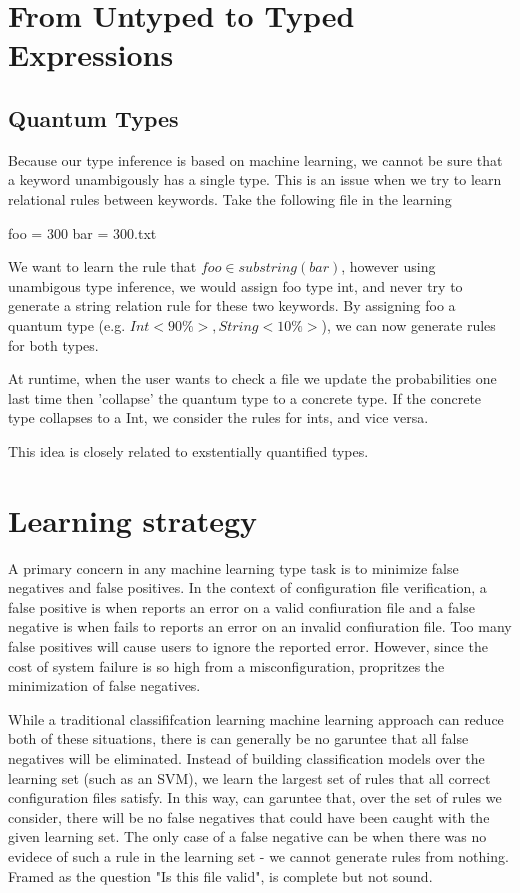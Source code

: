 \section{From Untyped to Typed Expressions}
\label{sec:translation}


\subsection{Quantum Types}

Because our type inference is based on machine learning, we cannot be sure that a keyword unambigously has a single type.
This is an issue when we try to learn relational rules between keywords. 
Take the following file in the learning

foo = 300
bar = 300.txt


We want to learn the rule that $foo \in {substring(bar)}$, however using unambigous type inference, we would assign foo type int, and never try to generate a string relation rule for these two keywords.
By assigning foo a quantum type (e.g. ${Int <90\%>, String <10\%>}$), we can now generate rules for both types.

At runtime, when the user wants to check a file we update the probabilities one last time then 'collapse' the quantum type to a concrete type.
If the concrete type collapses to a Int, we consider the rules for ints, and vice versa.

This idea is closely related to exstentially quantified types.


\section{Learning strategy}

A primary concern in any machine learning type task is to minimize false negatives and false positives.
In the context of configuration file verification,
  a false positive is when \app reports an error on a valid confiuration file and
  a false negative is when \app fails to reports an error on an invalid confiuration file.
Too many false positives will cause users to ignore the reported error\cite{}.
However, since the cost of system failure is so high from a misconfiguration, \app propritzes the minimization of false negatives.

While a traditional classififcation learning machine learning approach can reduce both of these situations, there is can generally be no garuntee that all false negatives will be eliminated.
Instead of building classification models over the learning set (such as an SVM), we learn the largest set of rules that all correct configuration files satisfy.
In this way, \app can garuntee that, over the set of rules we consider, there will be no false negatives that could have been caught with the given learning set.
The only case of a false negative can be when there was no evidece of such a rule in the learning set - we cannot generate rules from nothing.
Framed as the question "Is this file valid", \app is complete but not sound. 

